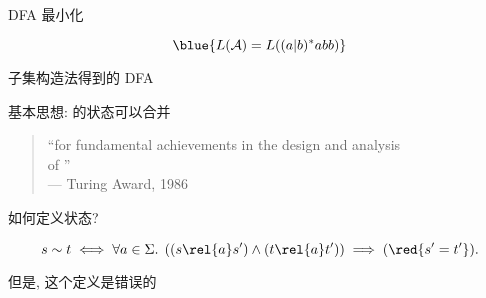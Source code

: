 \begin{frame}{}

  \vspace{0.30cm}
  \begin{center}
    DFA 最小化
  \end{center}
\end{frame}

\begin{frame}{}

  \[
    \blue{L(\mathcal{A}) = L((a|b)^{\ast}abb)}
  \]


  \begin{center}
    子集构造法得到的 DFA
  \end{center}
\end{frame}

\begin{frame}{}
  \begin{center}
    基本思想: 的状态可以合并

    \vspace{0.30cm}

    \vspace{0.30cm}
    \begin{quote}
      \centering
      ``for fundamental achievements in the design and analysis \\
      of '' \\
      \hfill --- Turing Award, 1986
    \end{quote}
  \end{center}
\end{frame}

\begin{frame}{}
  \begin{center}
    如何定义状态?


    \[
      s \sim t \iff \forall a \in \Sigma.\; 
        \left((s \rel{a} s') \land (t \rel{a} t')\right) \implies (\red{s' = t'}).
    \]

    \pause
    但是, 这个定义是错误的
  \end{center}
\end{frame}

